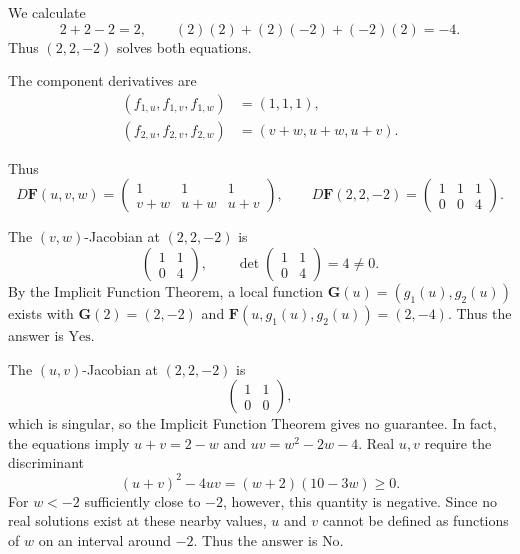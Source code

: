 \documentclass[11pt,oneside]{article}
\begin{document}
\begin{solution}
\begin{problemsubparts}
    \item We calculate
    \[
        2+2-2=2,
        \qquad
        (2)(2)+(2)(-2)+(-2)(2)=-4.
    \]
    Thus $(2,2,-2)$ solves both equations.

    \item The component derivatives are
    \[
        \begin{aligned}
            (f_{1,u},f_{1,v},f_{1,w})&=(1,1,1),\\
            (f_{2,u},f_{2,v},f_{2,w})&=(v+w,u+w,u+v).
        \end{aligned}
    \]

    \item Thus
    \[
        D\mathbf F(u,v,w)=\begin{pmatrix}1&1&1\\v+w&u+w&u+v\end{pmatrix},
        \qquad
        \boxed{D\mathbf F(2,2,-2)=\begin{pmatrix}1&1&1\\0&0&4\end{pmatrix}}.
    \]

    \item The $(v,w)$-Jacobian at $(2,2,-2)$ is
    \[
        \begin{pmatrix}1&1\\0&4\end{pmatrix},
        \qquad
        \det\begin{pmatrix}1&1\\0&4\end{pmatrix}=4\neq0.
    \]
    By the Implicit Function Theorem, a local function $\mathbf G(u)=(g_1(u),g_2(u))$ exists with $\mathbf G(2)=(2,-2)$ and $\mathbf F(u,g_1(u),g_2(u))=(2,-4)$. Thus the answer is $\boxed{\text{Yes}}$.

    \item The $(u,v)$-Jacobian at $(2,2,-2)$ is
    \[
        \begin{pmatrix}1&1\\0&0\end{pmatrix},
    \]
    which is singular, so the Implicit Function Theorem gives no guarantee. In fact, the equations imply $u+v=2-w$ and $uv=w^2-2w-4$. Real $u,v$ require the discriminant
    \[
        (u+v)^2-4uv=(w+2)(10-3w)\geq0.
    \]
    For $w<-2$ sufficiently close to $-2$, however, this quantity is negative. Since no real solutions exist at these nearby values, $u$ and $v$ cannot be defined as functions of $w$ on an interval around $-2$. Thus the answer is $\boxed{\text{No}}$.
\end{problemsubparts}
\end{solution}
\end{document}
